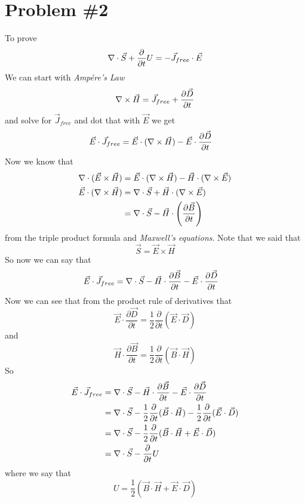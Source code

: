\documentclass[11pt]{article}
\numberwithin{equation}{section}
\newcommand{\grad}{\bold\nabla}
\begin{document}
\section{Problem \#2}
To prove
\begin{equation}
\grad\cdot\vec{S}+\frac{\partial}{\partial t}U = -\vec{J}_{free}\cdot\vec{E}
\label{Poyn}
\end{equation}
We can start with \emph{Amp\'{e}re's Law}
\begin{equation}
\grad\times\vec{H} = \vec{J}_{free}+\frac{\partial\vec{D}}{\partial t}
\label{Amp}
\end{equation}
and solve for $\vec{J}_{free}$ and dot that with $\vec{E}$ we get
\begin{align*}
\vec{E}\cdot\vec{J}_{free} &= \vec{E}\cdot(\grad\times\vec{H}) - \vec{E}\cdot\frac{\partial\vec{D}}{\partial t}
\end{align*}
Now we know that
\begin{align*}
\grad\cdot(\vec{E}\times\vec{H}) &= \vec{E}\cdot(\grad\times\vec{H})-\vec{H}\cdot(\grad\times\vec{E})\\
\vec{E}\cdot(\grad\times\vec{H}) &=  \grad\cdot\vec{S} + \vec{H}\cdot(\grad\times\vec{E})\\
&=  \grad\cdot\vec{S} - \vec{H}\cdot\left(\frac{\partial\vec{B}}{\partial t}\right)
\end{align*}
from the triple product formula and \emph{Maxwell's equations}. Note that we said that
$$\vec{S} = \vec{E}\times\vec{H}$$
So now we can say that
\begin{align*}
\vec{E}\cdot\vec{J}_{free} &= \grad\cdot\vec{S} - \vec{H}\cdot\frac{\partial\vec{B}}{\partial t} - \vec{E}\cdot\frac{\partial\vec{D}}{\partial t}
\end{align*}
Now we can see that from the product rule of derivatives that
$$\vec{E}\cdot\frac{\partial\vec{D}}{\partial t} = \frac{1}{2}\frac{\partial}{\partial t}(\vec{E}\cdot\vec{D})$$
and
$$\vec{H}\cdot\frac{\partial\vec{B}}{\partial t} = \frac{1}{2}\frac{\partial}{\partial t}(\vec{B}\cdot\vec{H})$$
So
\begin{align*}
\vec{E}\cdot\vec{J}_{free} &= \grad\cdot\vec{S} - \vec{H}\cdot\frac{\partial\vec{B}}{\partial t} - \vec{E}\cdot\frac{\partial\vec{D}}{\partial t}\\
&= \grad\cdot\vec{S} - \frac{1}{2}\frac{\partial}{\partial t}(\vec{B}\cdot\vec{H}) - \frac{1}{2}\frac{\partial}{\partial t}(\vec{E}\cdot\vec{D})\\
&= \grad\cdot\vec{S} - \frac{1}{2}\frac{\partial}{\partial t}(\vec{B}\cdot\vec{H} + \vec{E}\cdot\vec{D})\\
&= \grad\cdot\vec{S} - \frac{\partial}{\partial t}U
\end{align*}
where we say that
$$U = \frac{1}{2}(\vec{B}\cdot\vec{H} + \vec{E}\cdot\vec{D})$$
\end{document}
